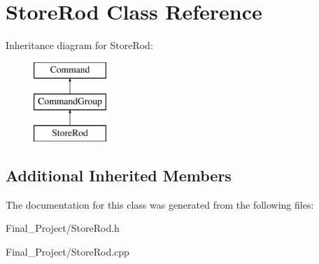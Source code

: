 \hypertarget{classStoreRod}{\section{Store\-Rod Class Reference}
\label{classStoreRod}
}
Inheritance diagram for Store\-Rod\-:\begin{figure}[H]
\begin{center}
\leavevmode
\includegraphics[height=3.000000cm]{classStoreRod}
\end{center}
\end{figure}
\subsection*{Additional Inherited Members}


The documentation for this class was generated from the following files\-:\begin{DoxyCompactItemize}
\item 
Final\-\_\-\-Project/Store\-Rod.\-h\item 
Final\-\_\-\-Project/Store\-Rod.\-cpp\end{DoxyCompactItemize}

